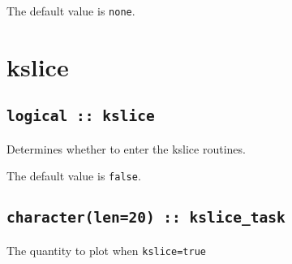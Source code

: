 The default value is {\tt none}.


\clearpage
\section{kslice}

\subsection[berry]{\tt logical :: kslice}
Determines whether to enter the kslice routines.

The default value is \verb#false#.

\subsection[kslice\_task]{\tt character(len=20) ::  kslice\_task}
The quantity to plot when {\tt kslice=true} 

